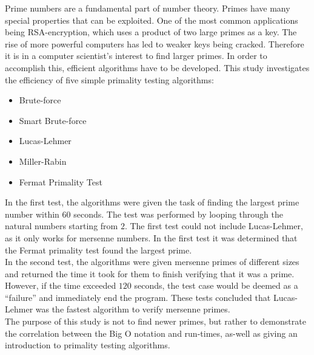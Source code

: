 \documentclass[main.tex]{subfiles}
\begin{document}
Prime numbers are a fundamental part of number theory. Primes have many special
properties that can be exploited. One of the most common applications being
RSA-encryption, which uses a product of two large primes as a key. The rise of
more powerful computers has led to weaker keys being cracked. Therefore it is in
a computer scientist's interest to find larger primes. In order to accomplish
this, efficient algorithms have to be developed. This study investigates the
efficiency of five simple primality testing algorithms:
\begin{multicols}{3}
  \begin{itemize}
  \item Brute-force
  \item Smart Brute-force
  \item Lucas-Lehmer
  \item Miller-Rabin
  \item Fermat Primality Test
  \end{itemize}
\end{multicols}

In the first test, the algorithms were given the task of finding the largest
prime number within $60$ seconds. The test was performed by looping through the
natural numbers starting from $2$. The first test could not include
Lucas-Lehmer, as it only works for mersenne numbers. In the first test it was
determined that the Fermat primality test found the largest prime. \\

In the second test, the algorithms were given mersenne primes of different sizes
and returned the time it took for them to finish verifying that it was a prime.
However, if the time exceeded $120$ seconds, the test case would be deemed as a
``failure'' and immediately end the program. These tests concluded that
Lucas-Lehmer was the fastest algorithm to verify mersenne primes. \\

The purpose of this study is not to find newer primes, but rather to demonstrate
the correlation between the Big O notation and run-times, as-well as giving an
introduction to primality testing algorithms. \\
\end{document}
